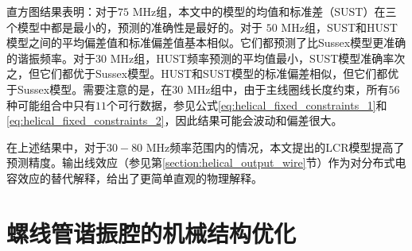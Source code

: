 


直方图结果表明：对于$75$ MHz组，本文中的模型的均值和标准差（SUST）在三个模型中都是最小的，预测的准确性是最好的。对于 $50$ MHz组，SUST和HUST模型之间的平均偏差值和标准偏差值基本相似。它们都预测了比Sussex模型更准确的谐振频率。对于$30$ MHz组，HUST频率预测的平均值最小，SUST模型准确率次之，但它们都优于Sussex模型。HUST和SUST模型的标准偏差相似，但它们都优于Sussex模型。需要注意的是，在$30$ MHz组中，由于主线圈线长度约束，所有$56$种可能组合中只有$11$个可行数据，参见公式\eqref{eq:helical_fixed_constraints_1}和\eqref{eq:helical_fixed_constraints_2}，因此结果可能会波动和偏差很大。

在上述结果中，对于$30-80$ MHz频率范围内的情况，本文提出的LCR模型提高了预测精度。输出线效应（参见第\ref{section:helical_output_wire}节）作为对分布式电容效应的替代解释，给出了更简单直观的物理解释。

\section[螺线管谐振腔的机械结构优化]{螺线管谐振腔的机械结构优化}

